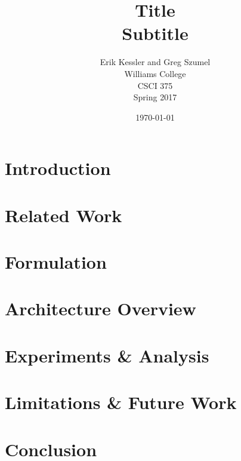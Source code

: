 \documentclass[a4paper,12pt]{article}
\begin{document}
\thispagestyle{plain}
\pagestyle{fancy}
\clearpage
\setlength{\headsep}{0.4in}


\title{Title\\ \large Subtitle}
\date{\today}
\author{
  {\rm Erik Kessler and Greg Szumel}\\
  Williams College\\
  CSCI 375 \\
  Spring 2017
}

\maketitle

\cfoot{\thepage}

\begin{abstract}
\end{abstract}


\section{Introduction}


\section{Related Work}
\cite{himabindu+mcauley+leskovec:13}
\cite{youmna+ardon+carlsson+eager+mahanti:12}
\cite{tan+lee+pang:14}

\section{Formulation}


\section{Architecture Overview}

\section{Experiments \& Analysis}

\section{Limitations \& Future Work}

\section{Conclusion}




\end{document}
